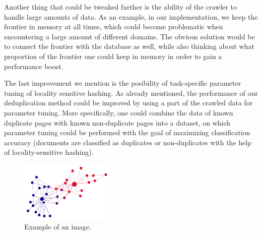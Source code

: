 \documentclass[9pt]{IEEEtran}
\begin{document}
Another thing that could be tweaked further is the ability of the crawler to handle large amounts of data.
As an example, in our implementation, we keep the frontier in memory at all times, which could become problematic when encountering a large amount of different domains.
The obvious solution would be to connect the frontier with the database as well, while also thinking about what proportion of the frontier one could keep in memory in order to gain a performance boost.

The last improvement we mention is the posibility of task-specific parameter tuning of locality sensitive hashing.
As already mentioned, the performance of our deduplication method could be improved by using a part of the crawled data for parameter tuning.
More specifically, one could combine the data of known duplicate pages with known non-duplicate pages into a dataset, on which parameter tuning could be performed with the goal of maximizing classification accuracy (documents are classified as duplicates or non-duplicates with the help of locality-sensitive hashing).

\begin{figure}[h] \centering
    \includegraphics[width=0.4\textwidth]{karate.png}
    \caption{{Example of an image.}}
    \label{fig:karate}
\end{figure}


 






\end{document}
